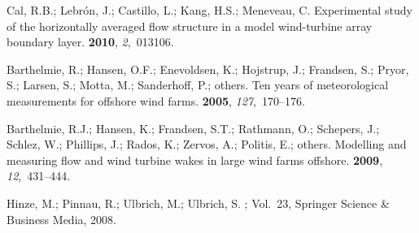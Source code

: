 \documentclass[energies,article,submit,moreauthors,latex,10pt,a4paper]{mdpi}
\begin{document}
\begin{thebibliography}{999}
	Cal, R.B.; Lebr{\'o}n, J.; Castillo, L.; Kang, H.S.; Meneveau, C.
	\newblock Experimental study of the horizontally averaged flow structure in a
	model wind-turbine array boundary layer.
	 {\bf 2010}, {\em 2},~013106.
	
	Barthelmie, R.; Hansen, O.F.; Enevoldsen, K.; Hojstrup, J.; Frandsen, S.;
	Pryor, S.; Larsen, S.; Motta, M.; Sanderhoff, P.; others.
	\newblock Ten years of meteorological measurements for offshore wind farms.
	{\bf 2005}, {\em 127},~170--176.
	
	Barthelmie, R.J.; Hansen, K.; Frandsen, S.T.; Rathmann, O.; Schepers, J.;
	Schlez, W.; Phillips, J.; Rados, K.; Zervos, A.; Politis, E.; others.
	\newblock Modelling and measuring flow and wind turbine wakes in large wind
	farms offshore.
	 {\bf 2009}, {\em 12},~431--444.
	
	Hinze, M.; Pinnau, R.; Ulbrich, M.; Ulbrich, S.
	; Vol.~23, Springer Science \&
	Business Media,  2008.
	
\end{thebibliography}
\end{document}
